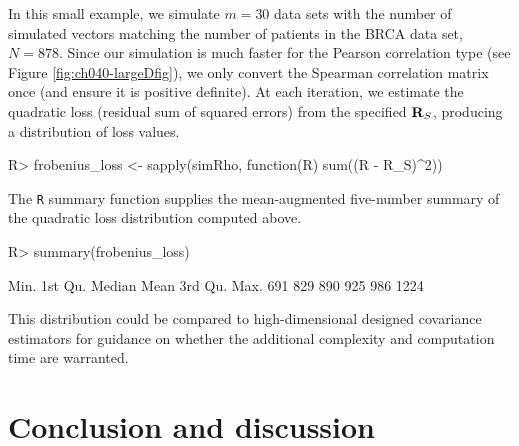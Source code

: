 \documentclass[
]{jss}
\begin{document}
In this small example, we simulate \(m=30\) data sets with the number of simulated vectors matching the number of patients in the BRCA data set, \(N=878\). Since our simulation is much faster for the Pearson correlation type (see Figure \ref{fig:ch040-largeDfig}), we only convert the Spearman correlation matrix once (and ensure it is positive definite). At each iteration, we estimate the quadratic loss (residual sum of squared errors) from the specified \({\bf R}_{S}\), producing a distribution of loss values.

\begin{CodeChunk}
\end{CodeChunk}

\begin{CodeChunk}
\begin{CodeInput}
R> frobenius_loss <- sapply(simRho, function(R) sum((R - R_S)^2))
\end{CodeInput}
\end{CodeChunk}

The \texttt{R} summary function supplies the mean-augmented five-number summary of the quadratic loss distribution computed above.

\begin{CodeChunk}
\begin{CodeInput}
R> summary(frobenius_loss)
\end{CodeInput}
\begin{CodeOutput}
   Min. 1st Qu.  Median    Mean 3rd Qu.    Max. 
    691     829     890     925     986    1224 
\end{CodeOutput}
\end{CodeChunk}

This distribution could be compared to high-dimensional designed covariance estimators for guidance on whether the additional complexity and computation time are warranted.

\hypertarget{discussion}{%
\section{Conclusion and discussion}\label{discussion}}
\end{document}
